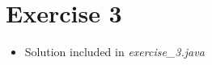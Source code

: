 \documentclass[12pt]{article}
\begin{document}
\bigskip

\section{Exercise 3}

\bigskip

\begin{itemize}
    \item Solution included in \textit{exercise\_3.java}
\end{itemize}
\end{document}
